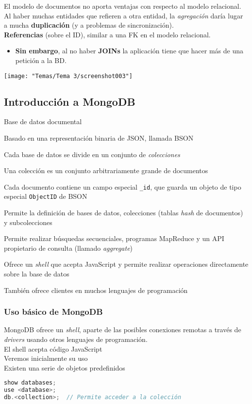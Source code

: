 El modelo de documentos no aporta ventajas con respecto al modelo relacional.\\
Al haber muchas entidades que refieren a otra entidad, la \textit{agregación} daría lugar a mucha \textbf{duplicación} (y a problemas de sincronización).\\
\textbf{Referencias} (sobre el ID), similar a una FK en el modelo relacional.
\begin{itemize}
	\item \textbf{Sin embargo}, al no haber \textbf{JOINs} la aplicación tiene que hacer más de una petición a la BD.
\end{itemize}
\begin{center}
	\texttt{[image: "Temas/Tema 3/screenshot003"]}
\end{center}
\subsection{Introducción a MongoDB}
Base de datos documental

Basado en una representación binaria de JSON, llamada BSON

Cada base de datos se divide en un conjunto de \textit{colecciones}

Una colección es un conjunto arbitrariamente grande de documentos

Cada documento contiene un campo especial \texttt{_id}, que guarda un objeto de tipo especial \texttt{ObjectID} de BSON

Permite la definición de bases de datos, colecciones (tablas \textit{hash} de documentos) y subcolecciones

Permite realizar búsquedas secuenciales, programas MapReduce y un API propietario de consulta (llamado \textit{aggregate})

Ofrece un \textit{shell} que acepta JavaScript y permite realizar operaciones directamente sobre la base de datos

También ofrece clientes en muchos lenguajes de programación
\subsubsection{Uso básico de MongoDB}
MongoDB ofrece un \textit{shell}, aparte de las posibles conexiones remotas a través de \textit{drivers} usando otros lenguajes de programación.\\
El shell acepta código JavaScript\\
Veremos inicialmente su uso\\
Existen una serie de objetos predefinidos\\
\begin{lstlisting}[language=JavaScript]
show databases;
use <database>;
db.<collection>;  // Permite acceder a la colección
\end{lstlisting}

